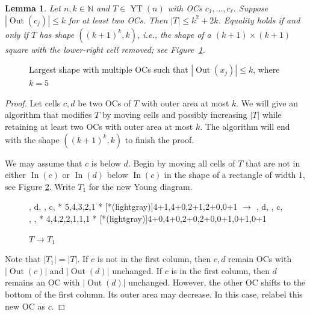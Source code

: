 \documentclass[12pt]{amsart}
\newtheorem{lemma}[theorem]{Lemma}
\theoremstyle{definition}
\theoremstyle{remark}
\numberwithin{equation}{section}
\numberwithin{figure}{section}
\newcommand{\YT}{\operatorname{YT}}
\newcommand{\Out}{\operatorname{Out}}
\newcommand{\In}{\operatorname{In}}
\newcommand{\N}{\mathbb{N}}
\begin{document}
\begin{lemma} \label{lemma: bad shape with small outer area}
    Let $n,k\in\N$ and $T\in\YT(n)$ with OCs $c_1, \ldots, c_\ell$. Suppose $|\Out(c_j)| \leq k$ for at least two OCs. Then $|T| \leq k^2 +2k$. Equality holds if and only if $T$ has shape $((k+1)^k, k)$, \emph{i.e.}, the shape of a $(k+1)\times (k+1)$ square with the lower-right cell removed; see Figure~\ref{figure: k+1 square minus lower right corner}.
\end{lemma}
\begin{figure}[H]
    \centering
    \caption{Largest shape with multiple OCs such that $|\Out(x_j)| \leq k$, where $k=5$}
    \label{figure: k+1 square minus lower right corner}
\end{figure}

\begin{proof}
    Let cells $c, d$ be two OCs of $T$ with outer area at most $k$. We will give an algorithm that modifies $T$ by moving cells and possibly increasing $|T|$ while retaining at least two OCs with outer area at most $k$. The algorithm will end with the shape $((k+1)^k, k)$ to finish the proof.

    We may assume that $c$ is below $d$. Begin by moving all cells of $T$ that are not in either $\In(c)$ or $\In(d)$ below $\In(c)$ in the shape of a rectangle of width $1$, see Figure \ref{figure: move cells pic 1}. Write $T_1$ for the new Young diagram.
    \begin{figure}[H]
    \centering
    \ytableaushort
        {\none, \none\none\none d, \none, \none c, \none }
        * {5,4,3,2,1}
        * [*(lightgray)]{4+1,4+0,2+1,2+0,0+1}
    \;\;\; $\longrightarrow$ \;\;\;\;\;\;\;\;
    \ytableaushort
        {\none, \none\none\none d, \none, \none c, \none, \none, \none }
        * {4,4,2,2,1,1,1}
        * [*(lightgray)]{4+0,4+0,2+0,2+0,0+1,0+1,0+1}
    \caption{$T \longrightarrow T_1$}
    \label{figure: move cells pic 1}
    \end{figure}

    Note that $|T_1|=|T|$. If $c$ is not in the first column, then $c,d$ remain OCs with $|\Out(c)|$ and $|\Out(d)|$ unchanged.
    If $c$ is in the first column, then $d$ remains an OC with $|\Out(d)|$ unchanged. However, the other OC shifts to the bottom of the first column. Its outer area may decrease. In this case, relabel this new OC as $c$.


\end{proof}
\end{document}
